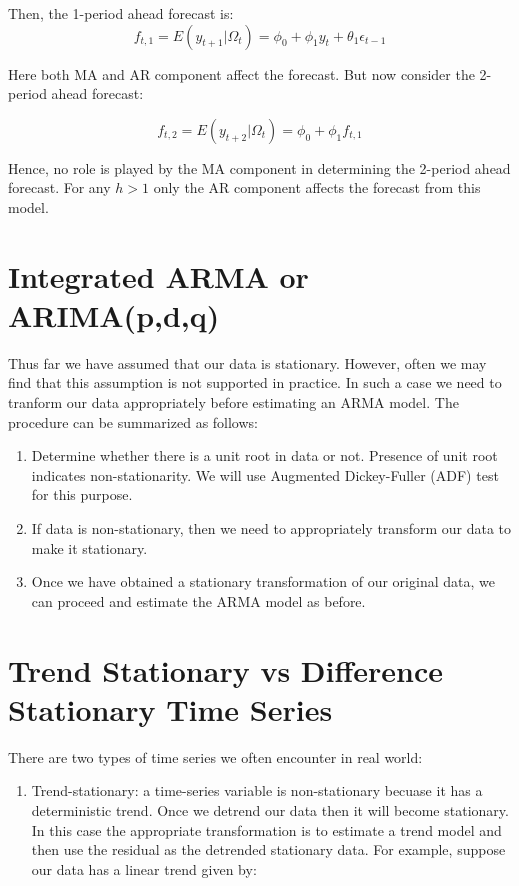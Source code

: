 \documentclass[]{book}
\providecommand{\tightlist}{%
  \setlength{\itemsep}{0pt}\setlength{\parskip}{0pt}}
\theoremstyle{definition}
\theoremstyle{definition}
\theoremstyle{definition}
\theoremstyle{remark}
\begin{document}
Then, the 1-period ahead forecast is:
\[f_{t,1} = E(y_{t+1}|\Omega_t) = \phi_0 + \phi_1 y_t + \theta_1 \epsilon_{t-1}\]

Here both MA and AR component affect the forecast. But now consider the 2-period ahead forecast:

\[f_{t,2} = E(y_{t+2}|\Omega_t) = \phi_0 + \phi_1 f_{t,1}\]

Hence, no role is played by the MA component in determining the 2-period ahead forecast. For any \(h>1\) only the AR component affects the forecast from this model.

\hypertarget{integrated-arma-or-arimapdq}{%
\section{Integrated ARMA or ARIMA(p,d,q)}\label{integrated-arma-or-arimapdq}}

Thus far we have assumed that our data is stationary. However, often we may find that this assumption is not supported in practice. In such a case we need to tranform our data appropriately before estimating an ARMA model. The procedure can be summarized as follows:

\begin{enumerate}
\def\labelenumi{\arabic{enumi}.}
\item
  Determine whether there is a unit root in data or not. Presence of unit root indicates non-stationarity. We will use Augmented Dickey-Fuller (ADF) test for this purpose.
\item
  If data is non-stationary, then we need to appropriately transform our data to make it stationary.
\item
  Once we have obtained a stationary transformation of our original data, we can proceed and estimate the ARMA model as before.
\end{enumerate}

\hypertarget{trend-stationary-vs-difference-stationary-time-series}{%
\section{Trend Stationary vs Difference Stationary Time Series}\label{trend-stationary-vs-difference-stationary-time-series}}

There are two types of time series we often encounter in real world:

\begin{enumerate}
\def\labelenumi{\arabic{enumi}.}
\tightlist
\item
  Trend-stationary: a time-series variable is non-stationary becuase it has a deterministic trend. Once we detrend our data then it will become stationary. In this case the appropriate transformation is to estimate a trend model and then use the residual as the detrended stationary data. For example, suppose our data has a linear trend given by:
\end{enumerate}
\end{document}

